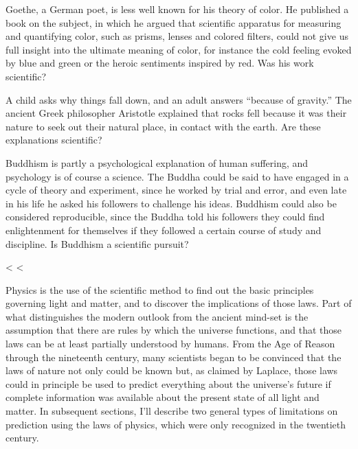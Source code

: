 \begin{dq}
Goethe, a German poet, is less well known for his
theory of color. He published a book on the subject, in
which he argued that scientific apparatus for measuring and
quantifying color, such as prisms, lenses and colored
filters, could not give us full insight into the ultimate
meaning of color, for instance the cold feeling evoked by
blue and green or the heroic sentiments inspired by red. Was
his work scientific?
\end{dq}

\begin{dq}
A child asks why things fall down, and an adult answers
``because of gravity.'' The ancient Greek philosopher
Aristotle explained that rocks fell because it was their
nature to seek out their natural place, in contact with the
earth. Are these explanations scientific?
\end{dq}

\begin{dq}
Buddhism is partly a psychological explanation of human
suffering, and psychology is of course a science.  The
Buddha could be said to have engaged in a cycle of theory
and experiment, since he worked by trial and error, and even
late in his life he asked his followers to challenge his
ideas.  Buddhism could also be considered reproducible,
since the Buddha told his followers they could find
enlightenment for themselves if they followed a certain
course of study and discipline.  Is Buddhism a scientific pursuit?
\end{dq}

<%
<%

\label{laplace-quote}

Physics is the use of the scientific method
to find out the basic principles governing light and matter,
and to discover the implications of those laws. Part of what
distinguishes the modern outlook from the ancient mind-set
is the assumption that there are rules by which the universe
functions, and that those laws can be at least partially
understood by humans. From the Age of Reason through the
nineteenth century, many scientists began to be convinced
that the laws of nature not only could be known but, as
claimed by Laplace, those laws could in principle be used to
predict everything about the universe's future if complete
information was available about the present state of all
light and matter. In subsequent sections, I'll describe two
general types of limitations on prediction using the laws of
physics, which were only recognized in the twentieth century.

